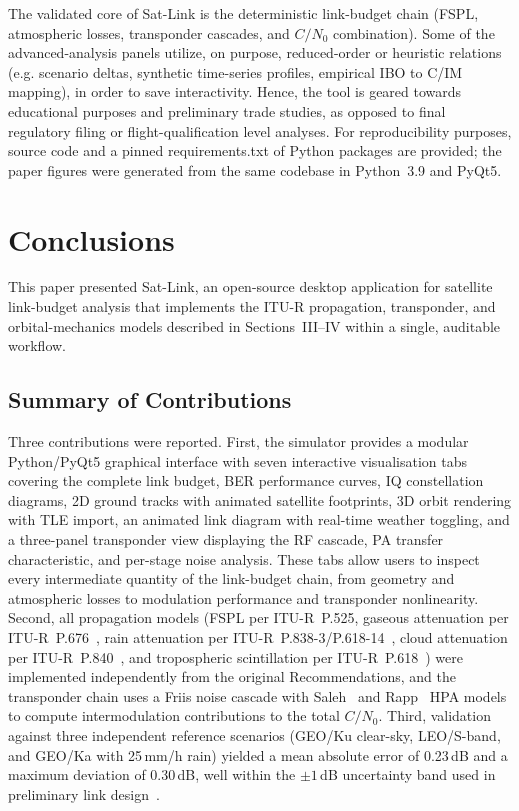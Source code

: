 \documentclass[telecom,article,submit,pdftex,moreauthors]{Definitions/mdpi}
\begin{document}
The validated core of Sat-Link is the deterministic link-budget chain (FSPL, atmospheric losses, transponder cascades, and $C/N_0$ combination). Some of the advanced-analysis panels utilize, on purpose, reduced-order or heuristic relations (e.g. scenario deltas, synthetic time-series profiles, empirical IBO to C/IM mapping), in order to save interactivity. Hence, the tool is geared towards educational purposes and preliminary trade studies, as opposed to final regulatory filing or flight-qualification level analyses. For reproducibility purposes, source code and a pinned requirements.txt of Python packages are provided; the paper figures were generated from the same codebase in Python~3.9 and PyQt5.


\section{Conclusions}
\label{sec:conclusion}

This paper presented Sat-Link, an open-source desktop application for
satellite link-budget analysis that implements the ITU-R propagation,
transponder, and orbital-mechanics models described in Sections~III--IV
within a single, auditable workflow.

\subsection{Summary of Contributions}

Three contributions were reported.
First, the simulator provides a modular Python/PyQt5 graphical interface
with seven interactive visualisation tabs covering the complete link
budget, BER performance curves, IQ constellation diagrams, 2D ground
tracks with animated satellite footprints, 3D orbit rendering with TLE
import, an animated link diagram with real-time weather toggling, and a
three-panel transponder view displaying the RF cascade, PA transfer
characteristic, and per-stage noise analysis.  These tabs allow users to
inspect every intermediate quantity of the link-budget chain, from
geometry and atmospheric losses to modulation performance and transponder
nonlinearity.
Second, all propagation models (FSPL per ITU-R~P.525, gaseous
attenuation per ITU-R~P.676~\cite{itu_p676}, rain attenuation per
ITU-R~P.838-3/P.618-14~\cite{itu_p838,itu_p618}, cloud attenuation per
ITU-R~P.840~\cite{itu_p840}, and tropospheric scintillation per
ITU-R~P.618~\cite{itu_p618}) were implemented independently from the
original Recommendations, and the transponder chain uses a Friis noise
cascade with Saleh~\cite{saleh1981} and Rapp~\cite{rapp1991} HPA models
to compute intermodulation contributions to the total $C/N_0$.
Third, validation against three independent reference scenarios
(GEO/Ku clear-sky, LEO/S-band, and GEO/Ka with 25\,mm/h rain) yielded a
mean absolute error of 0.23\,dB and a maximum deviation of 0.30\,dB,
well within the $\pm1$\,dB uncertainty band used in preliminary link
design~\cite{itu_s1328}.
\end{document}
